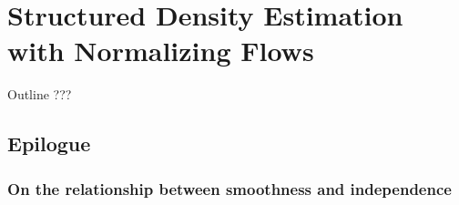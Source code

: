 \chapter{Structured Density Estimation with Normalizing Flows}\label{ch:06}

\begin{remark}{Outline}
???
\end{remark}



\section{Epilogue}
\subsection{On the relationship between smoothness and independence}
